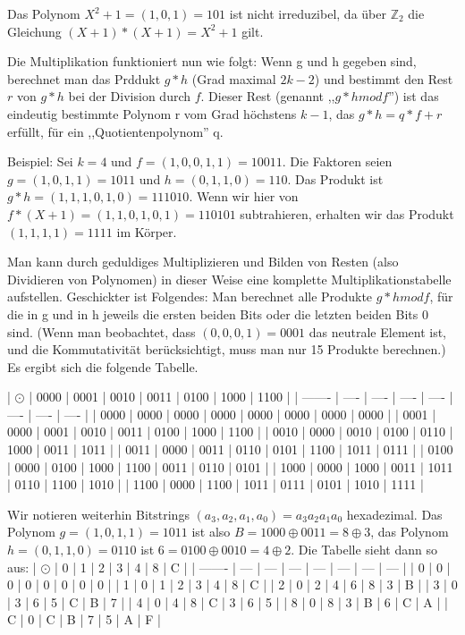 \documentclass[a4paper]{article}
\begin{document}
\begin{multicols}{3}
Das Polynom $X^2+1=(1,0,1)=101$ ist nicht irreduzibel, da über $\mathbb{Z}_2$ die Gleichung $(X+1)*(X+1)=X^2+1$ gilt.

Die Multiplikation funktioniert nun wie folgt: Wenn g und h gegeben sind, berechnet man das Prddukt $g*h$ (Grad maximal $2k-2$) und bestimmt den Rest $r$ von $g*h$ bei der Division durch $f$. Dieser Rest (genannt ,,$g*h mod f$'') ist das eindeutig bestimmte Polynom r vom Grad höchstens $k-1$, das $g*h=q*f+r$ erfüllt, für ein ,,Quotientenpolynom'' q.

Beispiel: Sei $k=4$ und $f=(1,0,0,1,1)=10011$. Die Faktoren seien $g=(1,0,1,1)=1011$ und $h=(0,1,1,0)=110$. Das Produkt ist $g*h=(1,1,1,0,1,0)=111010$. Wenn wir hier von $f*(X+1)=(1,1,0,1,0,1)=110101$ subtrahieren, erhalten wir das Produkt $(1,1,1,1)=1111$ im Körper.

Man kann durch geduldiges Multiplizieren und Bilden von Resten (also Dividieren von Polynomen) in dieser Weise eine komplette Multiplikationstabelle aufstellen. Geschickter ist Folgendes: Man berechnet alle Produkte $g*h mod f$, für die in g und in h jeweils die ersten beiden Bits oder die letzten beiden Bits 0 sind. (Wenn man beobachtet, dass $(0,0,0,1)=0001$ das neutrale Element ist, und die Kommutativität berücksichtigt, muss man nur 15 Produkte berechnen.) Es ergibt sich die folgende Tabelle.

| $\odot$ | 0000 | 0001 | 0010 | 0011 | 0100 | 1000 | 1100 |
| ------- | ---- | ---- | ---- | ---- | ---- | ---- | ---- |
| 0000    | 0000 | 0000 | 0000 | 0000 | 0000 | 0000 | 0000 |
| 0001    | 0000 | 0001 | 0010 | 0011 | 0100 | 1000 | 1100 |
| 0010    | 0000 | 0010 | 0100 | 0110 | 1000 | 0011 | 1011 |
| 0011    | 0000 | 0011 | 0110 | 0101 | 1100 | 1011 | 0111 |
| 0100    | 0000 | 0100 | 1000 | 1100 | 0011 | 0110 | 0101 |
| 1000    | 0000 | 1000 | 0011 | 1011 | 0110 | 1100 | 1010 |
| 1100    | 0000 | 1100 | 1011 | 0111 | 0101 | 1010 | 1111 |

Wir notieren weiterhin Bitstrings $(a_3,a_2,a_1,a_0)=a_3a_2a_1a_0$ hexadezimal. Das Polynom $g=(1,0,1,1)=1011$ ist also $B=1000\oplus 0011=8\oplus 3$, das Polynom $h=(0,1,1,0)=0110$ ist $6=0100\oplus 0010=4\oplus 2$.
Die Tabelle sieht dann so aus:
| $\odot$ | 0   | 1   | 2   | 3   | 4   | 8   | C   |
| ------- | --- | --- | --- | --- | --- | --- | --- |
| 0       | 0   | 0   | 0   | 0   | 0   | 0   | 0   |
| 1       | 0   | 1   | 2   | 3   | 4   | 8   | C   |
| 2       | 0   | 2   | 4   | 6   | 8   | 3   | B   |
| 3       | 0   | 3   | 6   | 5   | C   | B   | 7   |
| 4       | 0   | 4   | 8   | C   | 3   | 6   | 5   |
| 8       | 0   | 8   | 3   | B   | 6   | C   | A   |
| C       | 0   | C   | B   | 7   | 5   | A   | F   |


\end{multicols}
\end{document}
